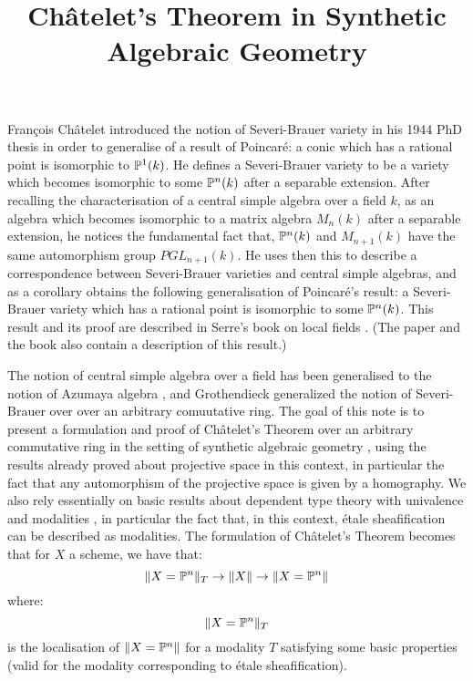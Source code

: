 \documentclass{../util/zariski}
\title{Ch\^atelet's Theorem in Synthetic Algebraic Geometry}
\begin{document}
\maketitle


{F}ran\c cois {C}h\^atelet introduced the notion of Severi-Brauer variety in his 1944 PhD thesis
\cite{chatelet44} in order to generalise of a result of Poincar\'e: a conic which has a rational point is isomorphic to $\mathbb{P}^1(k)$.
He defines a Severi-Brauer variety to be a variety which becomes isomorphic to some $\mathbb{P}^n(k)$ after
a separable extension. After recalling the characterisation of a central simple algebra over a field $k$, as
an algebra which becomes isomorphic to a matrix algebra $M_n(k)$ after a separable extension, he notices the fundamental
fact that, $\mathbb{P}^{n}(k)$ and $M_{n+1}(k)$ have the same automorphism group $PGL_{n+1}(k)$. He uses then this
to describe a correspondence between Severi-Brauer varieties and central simple algebras, and as a corollary
obtains the following generalisation of Poincar\'e's result: a Severi-Brauer variety which has a rational point
is isomorphic to some $\mathbb{P}^{n}(k)$. This result and its proof are described in Serre's book on local fields \cite{serre62}.
(The paper \cite{colliot88} and the book \cite{gille2017central} also contain a description of this result.)

The notion of central simple algebra over a field
has been generalised to the notion of Azumaya algebra  \cite{azumaya51}, and
Grothendieck \cite{grothendieck68} generalized the notion of Severi-Brauer over over an arbitrary comuutative ring.
The goal of this note is to present a formulation and proof of Ch\^atelet's Theorem over an arbitrary commutative ring
in the setting of synthetic algebraic geometry \cite{draft}, using the results already proved about projective
space \cite{sag-projective} in this context, in particular the fact that any automorphism of the projective space is given
by a homography. We also rely essentially on basic results about dependent type theory with univalence \cite{hott}
and modalities \cite{modalities}, in particular the fact that, in this context, \'etale sheafification can be described
as modalities. The formulation of Ch\^atelet's Theorem becomes that for $X$ a scheme, we have that:
\[\lVert X=\mathbb{P}^n \rVert_{T} \to \lVert X \rVert \to \lVert X=\mathbb{P}^n \rVert\]
where:
\[\lVert X=\mathbb{P}^n \rVert_{T}\]
is the localisation of $\lVert X=\mathbb{P}^n \rVert$ for a modality $T$ satisfying some basic properties (valid for the modality
corresponding to \'etale sheafification).
\end{document}
